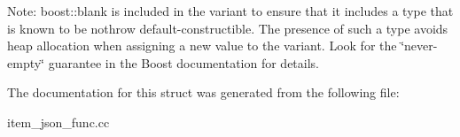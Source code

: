 Note\+: boost\+::blank is included in the variant to ensure that it includes a type that is known to be nothrow default-\/constructible. The presence of such a type avoids heap allocation when assigning a new value to the variant. Look for the \char`\"{}never-\/empty\char`\"{} guarantee in the Boost documentation for details. 

The documentation for this struct was generated from the following file\+:\begin{DoxyCompactItemize}
\item 
item\+\_\+json\+\_\+func.\+cc\end{DoxyCompactItemize}
